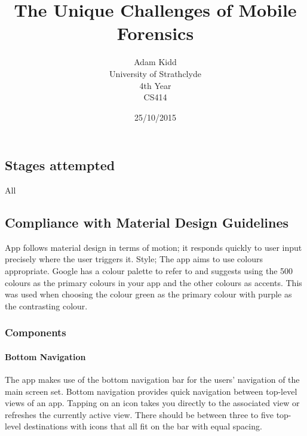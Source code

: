 \documentclass[12pt]{report}
\title{The Unique Challenges of Mobile Forensics}
\author {Adam Kidd\\
	University of Strathclyde\\
	4th Year\\
	CS414}
\date{25/10/2015}
\begin{document}
\maketitle





\chapter{}


\section{Stages attempted}

 All 


\section{Compliance with Material Design Guidelines}
App follows material design in terms of motion; it responds quickly to user input precisely where the user triggers it. Style; The app aims to use colours appropriate. Google has a colour palette to refer to and suggests using the 500 colours as the primary colours in your app and the other colours as accents. This was used when choosing the colour green as the primary colour with purple as the contrasting colour. 

\subsection{Components}

\subsubsection{Bottom Navigation}

The app makes use of the bottom navigation bar for the users’ navigation of the main screen set.
Bottom navigation provides quick navigation between top-level views of an app. Tapping on an icon takes you directly to the associated view or refreshes the currently active view. 
There should be between three to five top-level destinations with icons that all fit on the bar with equal spacing. 
\end{document}
